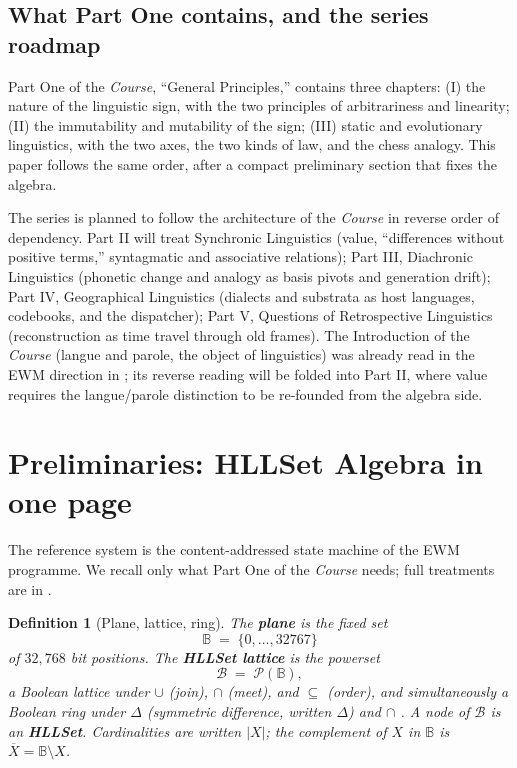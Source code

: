 \documentclass[11pt,a4paper]{article}
\newtheorem{definition}[principle]{Definition}
\theoremstyle{remark}
\newcommand{\Plane}{\ensuremath{\mathbb{B}}}            %
\newcommand{\Lat}{\ensuremath{\mathcal{B}}}              %
\newcommand{\xor}{\ensuremath{\Delta}}                   %
\begin{document}
\subsection{What Part One contains, and the series roadmap}

Part One of the \textit{Course}, ``General Principles,'' contains three
chapters: (I) the nature of the linguistic sign, with the two principles of
arbitrariness and linearity; (II) the immutability and mutability of the sign;
(III) static and evolutionary linguistics, with the two axes, the two kinds of
law, and the chess analogy. This paper follows the same order, after a compact
preliminary section that fixes the algebra.

The series is planned to follow the architecture of the \textit{Course} in
reverse order of dependency. Part II will treat Synchronic Linguistics (value,
``differences without positive terms,'' syntagmatic and associative relations);
Part III, Diachronic Linguistics (phonetic change and analogy as basis pivots
and generation drift); Part IV, Geographical Linguistics (dialects and
substrata as host languages, codebooks, and the dispatcher); Part V, Questions
of Retrospective Linguistics (reconstruction as time travel through old
frames). The Introduction of the \textit{Course} (langue and parole, the object
of linguistics) was already read in the EWM direction in
\cite{langue2026}; its reverse reading will be folded into Part II, where
value requires the langue/parole distinction to be re-founded from the algebra
side.

\section{Preliminaries: HLLSet Algebra in one page}
\label{sec:prelim}

The reference system is the content-addressed state machine of the EWM
programme. We recall only what Part One of the \textit{Course} needs; full
treatments are in \cite{ewm2026,companion2026,state2026,attention2026,langue2026}.

\begin{definition}[Plane, lattice, ring]
\label{def:plane}
The \textbf{plane} is the fixed set
\[
  \Plane \;=\; \{0,\dots,32767\}
\]
of $32{,}768$ bit positions. The \textbf{HLLSet lattice} is the powerset
\[
  \Lat \;=\; \mathcal{P}(\Plane),
\]
a Boolean lattice under $\cup$ (join), $\cap$ (meet), and $\subseteq$ (order),
and simultaneously a Boolean ring under $\xor$ (symmetric difference, written
$\Delta$) and $\cap$ \cite{birkhoff1940}. A node of $\Lat$ is an
\textbf{HLLSet}. Cardinalities are written $|X|$; the complement of $X$ in
$\Plane$ is $\overline{X} = \Plane \setminus X$.
\end{definition}
\end{document}
